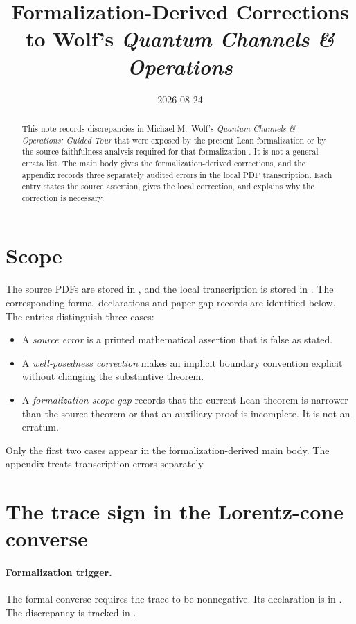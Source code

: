 \documentclass{article}
\title{Formalization-Derived Corrections to Wolf's \emph{Quantum Channels \& Operations}}
\author{}
\date{2026-08-24}
\begin{document}
\sloppy
\maketitle
{}

\begin{abstract}
This note records discrepancies in Michael M.~Wolf's \emph{Quantum Channels
\& Operations: Guided Tour} that were exposed by the present Lean
formalization or by the source-faithfulness analysis required for that
formalization \cite{Wolf2012Quantum}. It is not a general errata list. The main
body gives the formalization-derived corrections, and the appendix records
three separately audited errors in the local PDF transcription. Each entry
states the source assertion, gives the local correction, and explains why the
correction is necessary.
\end{abstract}

\section{Scope}

The source PDFs are stored in , and the local
transcription is stored in . The corresponding
formal declarations and paper-gap records are identified below. The entries
distinguish three cases:
\begin{itemize}
    \item A \emph{source error} is a printed mathematical assertion that is
          false as stated.
    \item A \emph{well-posedness correction} makes an implicit boundary
          convention explicit without changing the substantive theorem.
    \item A \emph{formalization scope gap} records that the current Lean
          theorem is narrower than the source theorem or that an auxiliary
          proof is incomplete. It is not an erratum.
\end{itemize}
Only the first two cases appear in the formalization-derived main body. The
appendix treats transcription errors separately.

\section{The trace sign in the Lorentz-cone converse}
\label{sec:lorentz}

\paragraph{Formalization trigger.}
The formal converse requires the trace to be nonnegative. Its declaration is
in . The discrepancy is
tracked in
.
\end{document}
